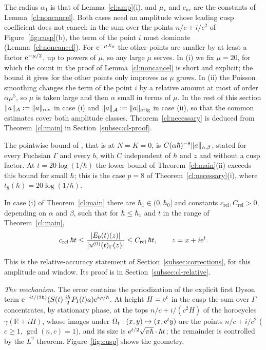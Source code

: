 The radius $\alpha_1$ is that of Lemma~\ref{cl:amp}(i), and $\mu_*$ and $c_{\mathrm{nc}}$ are the constants of Lemma~\ref{cl:noncancel}.
Both cases need an amplitude whose leading cusp coefficient does not cancel: in the sum over the points $n/c+i/c^2$ of
Figure~\ref{fig:cusp}(b), the term of the point $i$ must dominate (Lemma~\ref{cl:noncancel}). For $\mathrm{e}^{-\mu X_0}$ the other points are
smaller by at least a factor $\mathrm{e}^{-\mu/2}$, up to powers of $\mu$, so any large $\mu$ serves. In (i) we fix $\mu=20$, for which the count in the
proof of Lemma~\ref{cl:noncancel} is short and explicit; the bound it gives for the other points only improves as $\mu$ grows. In (ii) the Poisson smoothing changes
the term of the point $i$ by a relative amount at most of order $\alpha\mu^5$, so $\mu$ is taken large and then $\alpha$ small in terms of $\mu$.
In the rest of this section $\lVert a\rVert_{\mathcal A}:=\lVert a\rVert_{\mathrm{rev}}$ in case (i) and $\lVert a\rVert_{\mathcal A}:=\lVert a\rVert_{\mathrm{orig}}$ in case (ii), so that the common estimates
cover both amplitude classes. Theorem~\ref{cl:necessary} is deduced from Theorem~\ref{cl:main} in Section~\ref{subsec:cl-proof}.

\begin{remark}\label{cl:reading}
The pointwise bound of \cite[Corollary~1.6]{S}, that is \cite[(1.34)]{S} at $N=K=0$, is $C(\alpha\hbar)^{-8}\lVert a\rVert_{\alpha,\beta}$,
stated for every Fuchsian $\Gamma$ and every $b$, with $C$ independent of $\hbar$ and $z$ and without a cusp factor. At $t=20\log(1/\hbar)$ the lower
bound of Theorem~\ref{cl:main}(ii) exceeds this bound for small $\hbar$; this is the case $p=8$ of Theorem~\ref{cl:necessary}(i),
where $t_8(\hbar)=20\log(1/\hbar)$.
\end{remark}


\begin{proposition}\label{cl:relative}
In case (i) of Theorem~\ref{cl:main} there are $\hbar_1\in(0,\hbar_0]$ and constants $c_{\mathrm{rel}},C_{\mathrm{rel}}>0$, depending on
$\alpha$ and $\beta$, such that for $\hbar\le\hbar_1$ and $t$ in the range of Theorem~\ref{cl:main},
\[
c_{\mathrm{rel}}\,\hbar t\le\frac{|E_0(t)(z)|}{|u^{(0)}(t)_\Gamma(z)|}\le C_{\mathrm{rel}}\,\hbar t,\qquad z=x+i\mathrm{e}^t .
\]
\end{proposition}
This is the relative-accuracy statement of Section~\ref{subsec:corrections}, for this amplitude and window. Its proof is in Section~\ref{subsec:cl-relative}.

\medskip\noindent\emph{The mechanism.} The error contains the periodization of the explicit first
Dyson term $\mathrm{e}^{-it/(2\hbar)}(S(t)\,\tfrac{i\hbar}2P_1(t)a)\mathrm{e}^{i\varphi/\hbar}$. At height $H=\mathrm{e}^t$ in the cusp the sum
over $\Gamma$ concentrates, by stationary phase, at the tops $n/c+i/(c^2H)$ of the horocycles $\gamma(\mathbb R+iH)$, whose
images under $\Omega_t:(x,y)\mapsto(x,\mathrm{e}^ty)$ are the points $n/c+i/c^2$ ($c\ge1$, $\gcd(n,c)=1$), and its size is
$\mathrm{e}^{t/2}\sqrt{\pi\hbar}\cdot\hbar t$; the remainder is controlled by the $L^2$ theorem. Figure~\ref{fig:cusp} shows the geometry.

